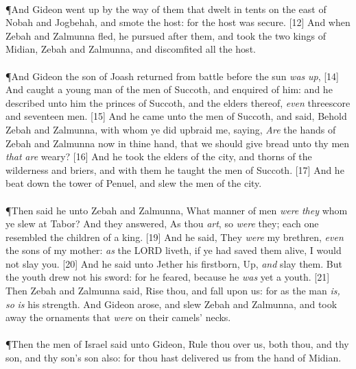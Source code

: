 \\
\P \textcolor[cmyk]{0.99998,1,0,0}{And Gideon went up by the way of them that dwelt in tents on the east of Nobah and Jogbehah, and smote the host: for the host was secure.}
[12] \textcolor[cmyk]{0.99998,1,0,0}{And when Zebah and Zalmunna fled, he pursued after them, and took the two kings of Midian, Zebah and Zalmunna, and discomfited all the host.}\\
\\
\P \textcolor[cmyk]{0.99998,1,0,0}{And Gideon the son of Joash returned from battle before the sun \emph{was} \emph{up},}
[14] \textcolor[cmyk]{0.99998,1,0,0}{And caught a young man of the men of Succoth, and enquired of him: and he described unto him the princes of Succoth, and the elders thereof, \emph{even} threescore and seventeen men.}
[15] \textcolor[cmyk]{0.99998,1,0,0}{And he came unto the men of Succoth, and said, Behold Zebah and Zalmunna, with whom ye did upbraid me, saying, \emph{Are} the hands of Zebah and Zalmunna now in thine hand, that we should give bread unto thy men \emph{that} \emph{are} weary?}
[16] \textcolor[cmyk]{0.99998,1,0,0}{And he took the elders of the city, and thorns of the wilderness and briers, and with them he taught the men of Succoth.}
[17] \textcolor[cmyk]{0.99998,1,0,0}{And he beat down the tower of Penuel, and slew the men of the city.}\\
\\
\P \textcolor[cmyk]{0.99998,1,0,0}{Then said he unto Zebah and Zalmunna, What manner of men \emph{were} \emph{they} whom ye slew at Tabor? And they answered, As thou \emph{art}, so \emph{were} they; each one resembled the children of a king.}
[19] \textcolor[cmyk]{0.99998,1,0,0}{And he said, They \emph{were} my brethren, \emph{even} the sons of my mother: \emph{as} the LORD liveth, if ye had saved them alive, I would not slay you.}
[20] \textcolor[cmyk]{0.99998,1,0,0}{And he said unto Jether his firstborn, Up, \emph{and} slay them. But the youth drew not his sword: for he feared, because he \emph{was} yet a youth.}
[21] \textcolor[cmyk]{0.99998,1,0,0}{Then Zebah and Zalmunna said, Rise thou, and fall upon us: for as the man \emph{is,} \emph{so} \emph{is} his strength. And Gideon arose, and slew Zebah and Zalmunna, and took away the ornaments that \emph{were} on their camels' necks.}\\
\\
\P \textcolor[cmyk]{0.99998,1,0,0}{Then the men of Israel said unto Gideon, Rule thou over us, both thou, and thy son, and thy son's son also: for thou hast delivered us from the hand of Midian.}
